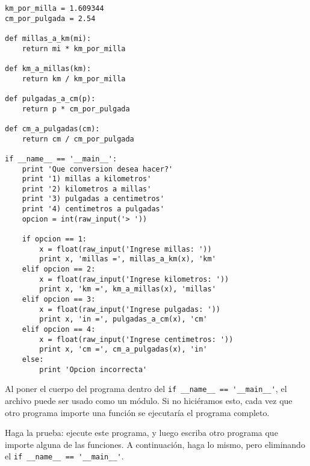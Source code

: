 \begin{lstlisting}
km_por_milla = 1.609344
cm_por_pulgada = 2.54

def millas_a_km(mi):
    return mi * km_por_milla

def km_a_millas(km):
    return km / km_por_milla

def pulgadas_a_cm(p):
    return p * cm_por_pulgada

def cm_a_pulgadas(cm):
    return cm / cm_por_pulgada

if __name__ == '__main__':
    print 'Que conversion desea hacer?'
    print '1) millas a kilometros'
    print '2) kilometros a millas'
    print '3) pulgadas a centimetros'
    print '4) centimetros a pulgadas'
    opcion = int(raw_input('> '))

    if opcion == 1:
        x = float(raw_input('Ingrese millas: '))
        print x, 'millas =', millas_a_km(x), 'km'
    elif opcion == 2:
        x = float(raw_input('Ingrese kilometros: '))
        print x, 'km =', km_a_millas(x), 'millas'
    elif opcion == 3:
        x = float(raw_input('Ingrese pulgadas: '))
        print x, 'in =', pulgadas_a_cm(x), 'cm'
    elif opcion == 4:
        x = float(raw_input('Ingrese centimetros: '))
        print x, 'cm =', cm_a_pulgadas(x), 'in'
    else:
        print 'Opcion incorrecta'
\end{lstlisting}

Al poner el cuerpo del programa dentro del
\lstinline!if __name__ == '__main__'!, el archivo puede ser usado como
un módulo. Si no hiciéramos esto, cada vez que otro programa importe una
función se ejecutaría el programa completo.

Haga la prueba:
ejecute este programa, y luego escriba otro programa que importe alguna
de las funciones. A continuación, haga lo mismo, pero eliminando el
\lstinline!if __name__ == '__main__'!.
